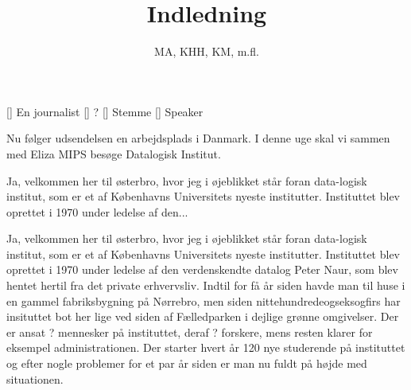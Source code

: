 \documentclass[a4paper,11pt]{article}
\title{Indledning}
\author{MA, KHH, KM, m.fl.}
\begin{document}
\maketitle

\begin{roles}
[] En journalist
[] ?
[] Stemme
[] Speaker
\end{roles}

\begin{sketch}


   Nu følger udsendelsen en arbejdsplads i Danmark.  I denne
  uge skal vi sammen med Eliza MIPS besøge Datalogisk Institut.


   Ja, velkommen her til østerbro, hvor jeg i øjeblikket står
  foran data-logisk institut, som er et af Københavns Universitets
  nyeste institutter.  Instituttet blev oprettet i 1970 under ledelse
  af den...


   Ja, velkommen her til østerbro, hvor jeg i øjeblikket står
  foran data-logisk institut, som er et af Københavns Universitets
  nyeste institutter.  Instituttet blev oprettet i 1970 under ledelse
  af den verdenskendte datalog Peter Naur, som blev hentet hertil fra
  det private erhvervsliv.  Indtil for få år siden havde man til huse
  i en gammel fabriksbygning på Nørrebro, men siden
  nittehundredeogseksogfirs har insituttet bot her lige ved siden af
  Fælledparken i dejlige grønne omgivelser.  Der er ansat ? mennesker
  på instituttet, deraf ? forskere, mens resten klarer for eksempel
  administrationen.  Der starter hvert år 120 nye studerende på
  instituttet og efter nogle problemer for et par år siden er man nu
  fuldt på højde med situationen.


\end{sketch}
\end{document}
